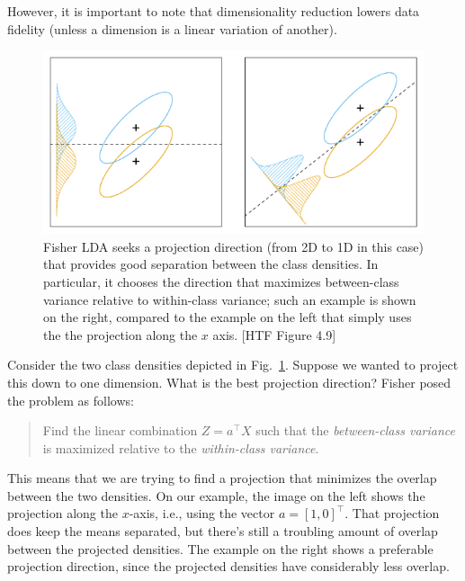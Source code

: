 \documentclass[a4paper]{article}
\begin{document}
However, it is important to note that dimensionality reduction lowers data fidelity (unless a dimension is a linear variation of another). 

\begin{figure}
\centering
\includegraphics[width=1.0\textwidth]{projection_directions.png}
\caption{\label{fig:projection_directions}Fisher LDA seeks a projection direction (from 2D to 1D in this case) that provides good separation between the class densities.  In particular, it chooses the direction that maximizes between-class variance relative to within-class variance; such an example is shown on the right, compared to the example on the left that simply uses the the projection along the $x$ axis. [HTF Figure 4.9]}
\end{figure}


Consider the two class densities depicted in Fig.\ \ref{fig:projection_directions}.  Suppose we wanted to project this down to one dimension.  What is the best projection direction?  Fisher posed the problem as follows: 
\begin{quotation}
Find the linear combination $Z=a^\top X$ such that the \emph{between-class variance} is maximized relative to the \emph{within-class variance}.
\end{quotation}
This means that we are trying to find a projection that minimizes the overlap between the two densities. On our example, the image on the left shows the projection along the $x$-axis, i.e., using the vector $a=[1,0]^\top$.  That projection does keep the means separated, but there's still a troubling amount of overlap between the projected densities.  The example on the right shows a preferable projection direction, since the projected densities have considerably less overlap.
\end{document}
